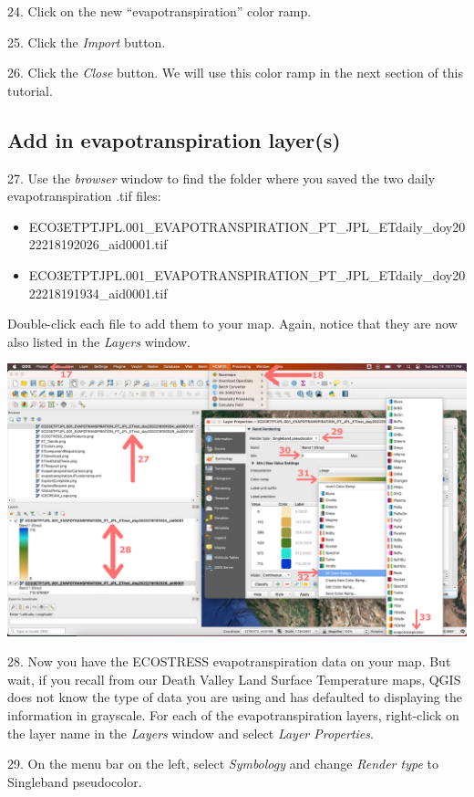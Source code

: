 \documentclass[oneside,a4paper,11pt,explicit]{book}
\begin{document}
24. Click on the new ``evapotranspiration'' color ramp.

25. Click the \textit{Import} button.

26. Click the \textit{Close} button. We will use this color ramp in the next section of this tutorial.

\subsection{Add in evapotranspiration layer(s)}

27. Use the \textit{browser} window to find the folder where you saved the two daily evapotranspiration .tif files: 
\begin{itemize}
	\item ECO3ETPTJPL.001\_EVAPOTRANSPIRATION\_PT\_JPL\_ETdaily\_doy2022218192026\_aid0001.tif
	\item ECO3ETPTJPL.001\_EVAPOTRANSPIRATION\_PT\_JPL\_ETdaily\_doy2022218191934\_aid0001.tif
\end{itemize}
Double-click each file to add them to your map. Again, notice that they are now also listed in the \textit{Layers} window.

\centerline{\includegraphics[width=\textwidth]{ETmapping.png}}

28. Now you have the ECOSTRESS evapotranspiration data on your map. But wait, if you recall from our Death Valley Land Surface Temperature maps, QGIS does not know the type of data you are using and has defaulted to displaying the information in grayscale. For each of the evapotranspiration layers, right-click on the layer name in the \textit{Layers} window and select \textit{Layer Properties}. 

29. On the menu bar on the left, select \textit{Symbology} and change \textit{Render type} to Singleband pseudocolor. 
\end{document}
